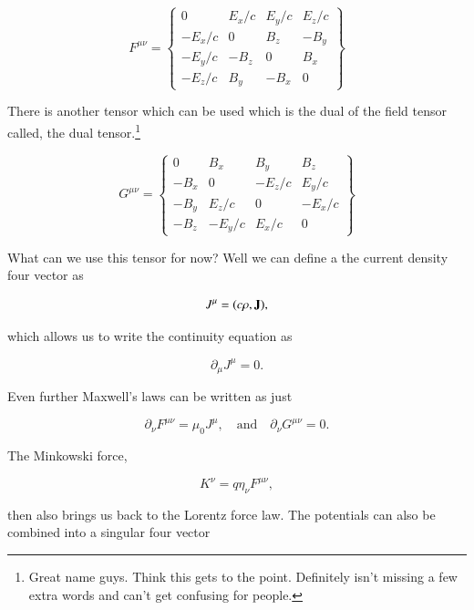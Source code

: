 \documentclass[preprint, review,12pt]{elsarticle}
\def\b{\textbf}
\def\and{\quad \text{and} \quad}
\begin{document}
\begin{equation}
F^{\mu\nu} =
\begin{Bmatrix}
0 & E_x/c & E_y/c & E_z/c \\
-E_x/c & 0 & B_z & -B_y \\
-E_y/c & -B_z & 0 & B_x \\
-E_z/c & B_y & -B_x & 0
\end{Bmatrix}
\end{equation}

There is another tensor which can be used which is the dual of the field tensor called, the dual tensor.\footnote{Great name guys. Think this gets to the point. Definitely isn't missing a few extra words and can't get confusing for people.}

\begin{equation}
G^{\mu\nu} =
\begin{Bmatrix}
0 & B_x & B_y & B_z \\
-B_x & 0 & -E_z/c & E_y/c \\
-B_y & E_z/c & 0 & -E_x/c \\
-B_z & -E_y/c & E_x/c & 0
\end{Bmatrix}
\end{equation}

What can we use this tensor for now? Well we can define a the current density four vector as 

\begin{equation}
    J^\mu = (c\rho, \b J),
\end{equation}

which allows us to write the continuity equation as 

\begin{equation}
    \partial_\mu J^\mu = 0.
\end{equation}

Even further Maxwell's laws can be written as just 

\begin{equation}
    \partial_\nu F^{\mu\nu} = \mu_0 J^\mu, \and \partial_\nu G^{\mu\nu} = 0.
\end{equation}

The Minkowski force,

\begin{equation}
    K^\nu = q\eta_\nu F^{\mu\nu},
\end{equation}

then also brings us back to the Lorentz force law. The potentials can also be combined into a singular four vector
\end{document}
